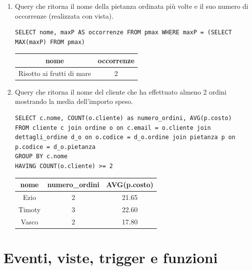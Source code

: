 \documentclass[10pt]{article}
\begin{document}
\begin{enumerate}[noitemsep]
	\item Query che ritorna il nome della pietanza ordinata più volte e il suo numero di occorrenze (realizzata con vista).
	\begin{lstlisting}[style=Mysql]
SELECT nome, maxP AS occorrenze FROM pmax WHERE maxP = (SELECT MAX(maxP) FROM pmax) \end{lstlisting}	
	\begin{table}[ht]
	\centering
		\label{table:query5}
		\begin{tabular}{|c|c|}
			\hline
			\multirow{1}{*}{\textbf{nome}} & \multicolumn{1}{c|}{\textbf{occorrenze}}\\
			\hline
			Risotto ai frutti di mare & 2\\ 
			\hline
			\end{tabular}
	\end{table}
		\item Query che ritorna il nome del cliente che ha effettuato almeno 2 ordini mostrando la media dell'importo speso.	\begin{lstlisting}[style=Mysql]
SELECT c.nome, COUNT(o.cliente) as numero_ordini, AVG(p.costo)
FROM cliente c join ordine o on c.email = o.cliente join dettagli_ordine d_o on o.codice = d_o.ordine join pietanza p on p.codice = d_o.pietanza 
GROUP BY c.nome
HAVING COUNT(o.cliente) >= 2
\end{lstlisting}	
\begin{center}
	\begin{table}[ht]
	\centering
		\label{table:query4}
		\begin{tabular}{|c|c|c|}
			\hline
			\multirow{1}{*}{\textbf{nome}} & \multicolumn{1}{c|}{\textbf{numero\_ordini}} & \multicolumn{1}{c|}{\textbf{AVG(p.costo)}}\\
			\hline
			Ezio & 2 & 21.65\\ \hline
			Timoty & 3 & 22.60\\ \hline
			Vasco & 2 & 17.80\\ \hline
			\end{tabular}
	\end{table}
\end{center}
	\end{enumerate}
		\pagebreak
		\section{Eventi, viste, trigger e funzioni}
\end{document}
